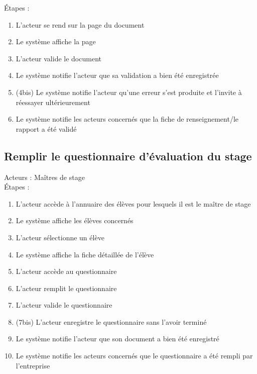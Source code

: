 \documentclass{scrreprt}
\begin{document}
\'Etapes : 
\begin{enumerate}
\item L’acteur se rend sur la page du document
\item Le système affiche la page
\item L’acteur valide le document
\item Le système notifie l’acteur que sa validation a bien été enregistrée
\item (4bis) Le système notifie l’acteur qu’une erreur s’est produite et l’invite à réessayer ultérieurement
\item Le système notifie les acteurs concernés que la fiche de renseignement/le rapport a été validé
\end{enumerate}

\newpage
\subsection{Remplir le questionnaire d’\'evaluation du stage}
Acteurs : Ma\^itres de stage 
\\
\'Etapes : 
\begin{enumerate}
\item L’acteur acc\`ede \`a l’annuaire des \'el\`eves pour lesquels il est le ma\^itre de stage
\item Le syst\`eme affiche les \'el\`eves concern\'es
\item L’acteur s\'electionne un \'el\`eve
\item Le syst\`eme affiche la fiche d\'etaill\'ee de l’\'el\`eve
\item L’acteur acc\`ede au questionnaire 
\item L’acteur remplit le questionnaire 
\item L’acteur valide le questionnaire
\item (7bis) L’acteur enregistre le questionnaire sans l’avoir termin\'e
\item Le syst\`eme notifie l’acteur que son document a bien \'et\'e enregistr\'e
\item Le syst\`eme notifie les acteurs concern\'es que le questionnaire a \'et\'e rempli par l’entreprise
\end{enumerate}
\end{document}
